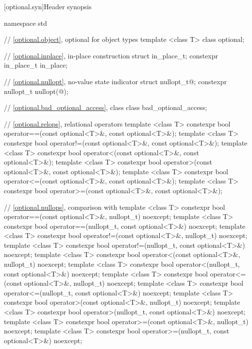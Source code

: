 [optional.syn]{Header  synopsis}

%
\begin{codeblock}
namespace std {
  // \ref{optional.object}, optional for object types
  template <class T> class optional;

  // \ref{optional.inplace}, in-place construction
  struct in_place_t{};
  constexpr in_place_t in_place{};

  // \ref{optional.nullopt}, no-value state indicator
  struct nullopt_t{@\seebelow@};
  constexpr nullopt_t nullopt(@\unspec@);

  // \ref{optional.bad_optional_access}, class 
  class bad_optional_access;

  // \ref{optional.relops}, relational operators
  template <class T>
  constexpr bool operator==(const optional<T>&, const optional<T>&);
  template <class T>
  constexpr bool operator!=(const optional<T>&, const optional<T>&);
  template <class T>
  constexpr bool operator<(const optional<T>&, const optional<T>&);
  template <class T>
  constexpr bool operator>(const optional<T>&, const optional<T>&);
  template <class T>
  constexpr bool operator<=(const optional<T>&, const optional<T>&);
  template <class T>
  constexpr bool operator>=(const optional<T>&, const optional<T>&);

  // \ref{optional.nullops}, comparison with 
  template <class T> constexpr bool operator==(const optional<T>&, nullopt_t) noexcept;
  template <class T> constexpr bool operator==(nullopt_t, const optional<T>&) noexcept;
  template <class T> constexpr bool operator!=(const optional<T>&, nullopt_t) noexcept;
  template <class T> constexpr bool operator!=(nullopt_t, const optional<T>&) noexcept;
  template <class T> constexpr bool operator<(const optional<T>&, nullopt_t) noexcept;
  template <class T> constexpr bool operator<(nullopt_t, const optional<T>&) noexcept;
  template <class T> constexpr bool operator<=(const optional<T>&, nullopt_t) noexcept;
  template <class T> constexpr bool operator<=(nullopt_t, const optional<T>&) noexcept;
  template <class T> constexpr bool operator>(const optional<T>&, nullopt_t) noexcept;
  template <class T> constexpr bool operator>(nullopt_t, const optional<T>&) noexcept;
  template <class T> constexpr bool operator>=(const optional<T>&, nullopt_t) noexcept;
  template <class T> constexpr bool operator>=(nullopt_t, const optional<T>&) noexcept;

}
\end{codeblock}
